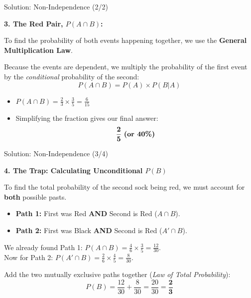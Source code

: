 \begin{frame}{Solution: Non-Independence (2/2)}
    \begin{solution}
        \textbf{3. The Red Pair, $P(A \cap B)$:}
        
        \vspace{0.2cm}
        To find the probability of both events happening together, we use the \textbf{General Multiplication Law}. 
        
        \vspace{0.2cm}
        Because the events are dependent, we multiply the probability of the first event by the \textit{conditional} probability of the second:
        \[ P(A \cap B) = P(A) \times P(B|A) \]
        
        \pause \vspace{0.3cm}
        
        \begin{itemize}
            \item $P(A \cap B) = \frac{2}{3} \times \frac{3}{5} = \frac{6}{15}$
            
            \vspace{0.2cm}
            \item Simplifying the fraction gives our final answer:
            \[ \mathbf{\frac{2}{5}} \text{ \textbf{(or 40\%)}} \]
        \end{itemize}
    \end{solution}
\end{frame}

\begin{frame}{Solution: Non-Independence (3/4)}
    \begin{solution}
        \textbf{4. The Trap: Calculating Unconditional $P(B)$}
        
        \vspace{0.2cm}
        To find the total probability of the second sock being red, we must account for \textbf{both} possible pasts.
        \begin{itemize}
            \item \textbf{Path 1:} First was Red \textbf{AND} Second is Red ($A \cap B$).
            \item \textbf{Path 2:} First was Black \textbf{AND} Second is Red ($A' \cap B$).
        \end{itemize}

        \pause \vspace{0.3cm}
        
        We already found Path 1: $P(A \cap B) = \frac{4}{6} \times \frac{3}{5} = \frac{12}{30}$. \\
        \pause
        Now for Path 2: $P(A' \cap B) = \frac{2}{6} \times \frac{4}{5} = \frac{8}{30}$.
        
        \pause \vspace{0.3cm}
        
        Add the two mutually exclusive paths together (\textit{Law of Total Probability}):
        \[ P(B) = \frac{12}{30} + \frac{8}{30} = \frac{20}{30} = \mathbf{\frac{2}{3}} \]
    \end{solution}
\end{frame}

